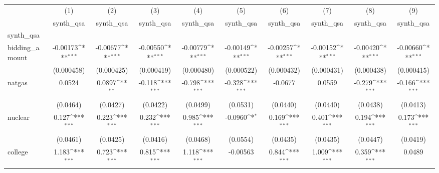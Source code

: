 {
\def\sym#1{\ifmmode^{#1}\else\(^{#1}\)\fi}
\begin{tabular}{l*{9}{c}}
\hline\hline
            &\multicolumn{1}{c}{(1)}&\multicolumn{1}{c}{(2)}&\multicolumn{1}{c}{(3)}&\multicolumn{1}{c}{(4)}&\multicolumn{1}{c}{(5)}&\multicolumn{1}{c}{(6)}&\multicolumn{1}{c}{(7)}&\multicolumn{1}{c}{(8)}&\multicolumn{1}{c}{(9)}\\
            &\multicolumn{1}{c}{synth\_qsa}&\multicolumn{1}{c}{synth\_qsa}&\multicolumn{1}{c}{synth\_qsa}&\multicolumn{1}{c}{synth\_qsa}&\multicolumn{1}{c}{synth\_qsa}&\multicolumn{1}{c}{synth\_qsa}&\multicolumn{1}{c}{synth\_qsa}&\multicolumn{1}{c}{synth\_qsa}&\multicolumn{1}{c}{synth\_qsa}\\
\hline
synth\_qsa   &                     &                     &                     &                     &                     &                     &                     &                     &                     \\
bidding\_amount&    -0.00173\sym{***}&    -0.00677\sym{***}&    -0.00550\sym{***}&    -0.00779\sym{***}&    -0.00149\sym{***}&    -0.00257\sym{***}&    -0.00152\sym{***}&    -0.00420\sym{***}&    -0.00660\sym{***}\\
            &  (0.000458)         &  (0.000425)         &  (0.000419)         &  (0.000480)         &  (0.000522)         &  (0.000432)         &  (0.000431)         &  (0.000438)         &  (0.000415)         \\
[1em]
natgas      &      0.0524         &      0.0897\sym{**} &      -0.118\sym{***}&      -0.798\sym{***}&      -0.328\sym{***}&     -0.0677         &      0.0559         &      -0.279\sym{***}&      -0.166\sym{***}\\
            &    (0.0464)         &    (0.0427)         &    (0.0422)         &    (0.0499)         &    (0.0531)         &    (0.0440)         &    (0.0440)         &    (0.0438)         &    (0.0413)         \\
[1em]
nuclear     &       0.127\sym{***}&       0.223\sym{***}&       0.232\sym{***}&       0.985\sym{***}&     -0.0960\sym{*}  &       0.169\sym{***}&       0.401\sym{***}&       0.194\sym{***}&       0.173\sym{***}\\
            &    (0.0461)         &    (0.0425)         &    (0.0416)         &    (0.0468)         &    (0.0554)         &    (0.0435)         &    (0.0435)         &    (0.0447)         &    (0.0419)         \\
[1em]
college     &       1.183\sym{***}&       0.723\sym{***}&       0.815\sym{***}&       1.118\sym{***}&    -0.00563         &       0.844\sym{***}&       1.009\sym{***}&       0.359\sym{***}&      0.0489         \\

\end{tabular}}

